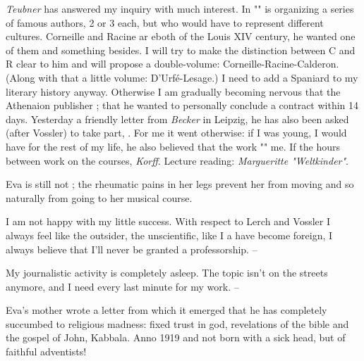 \textit{Teubner} has answered my inquiry with much interest. In "" is organizing a series of famous authors, 2 or 3 each, but who would have to represent different cultures. Corneille and Racine ar eboth of the Louis XIV century, he wanted one of them and something besides. I will try to make the distinction between C and R clear to him and will propose a double-volume: Corneille-Racine-Calderon. (Along with that a little volume: D'Urfé-Lesage.) I need to add a Spaniard to my literary history anyway. Otherwise I am gradually becoming nervous that the Athenaion publisher ;  that he wanted to personally conclude a contract within 14 days. Yesterday a friendly letter from \textit{Becker} in Leipzig, he has also been asked (after Vossler) to take part, . For me it went otherwise: if I was young, I would have  for the rest of my life, he also believed that the work "" me. If the hours between work on the courses, \textit{Korff}. Lecture reading: \textit{Margueritte "Weltkinder"}.

Eva is still not ; the rheumatic pains in her legs prevent her from moving and so naturally from going to her musical course.

I am not happy with my little success. With respect to Lerch and Vossler I always feel like the outsider, the unscientific, like I a
have become foreign, I always believe that I'll never be granted a professorship. --

My journalistic activity is completely asleep. The topic isn't on the streets anymore, and I need every last minute for my work. --

Eva's mother wrote a letter from which it emerged that he has completely succumbed to religious madness: fixed trust in god, revelations of the bible and the gospel of John, Kabbala. Anno 1919 and not born with a sick head, but  of faithful adventists!